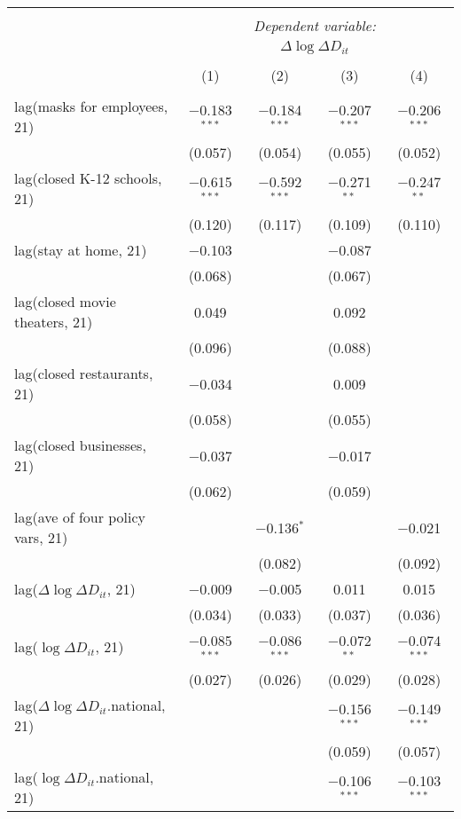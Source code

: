 \begin{tabular}{@{\extracolsep{1pt}}lcccc} 
\\[-1.8ex]\hline 
\hline \\[-1.8ex] 
 & \multicolumn{4}{c}{\textit{Dependent variable:}} \\ 
\cline{2-5} 
 & \multicolumn{4}{c}{$\Delta \log \Delta D_{it}$} \\ 
\\[-1.8ex] & (1) & (2) & (3) & (4)\\ 
\hline \\[-1.8ex] 
 lag(masks for employees, 21) & $-$0.183$^{***}$ & $-$0.184$^{***}$ & $-$0.207$^{***}$ & $-$0.206$^{***}$ \\ 
  & (0.057) & (0.054) & (0.055) & (0.052) \\ 
  lag(closed K-12 schools, 21) & $-$0.615$^{***}$ & $-$0.592$^{***}$ & $-$0.271$^{**}$ & $-$0.247$^{**}$ \\ 
  & (0.120) & (0.117) & (0.109) & (0.110) \\ 
  lag(stay at home, 21) & $-$0.103 &  & $-$0.087 &  \\ 
  & (0.068) &  & (0.067) &  \\ 
  lag(closed movie theaters, 21) & 0.049 &  & 0.092 &  \\ 
  & (0.096) &  & (0.088) &  \\ 
  lag(closed restaurants, 21) & $-$0.034 &  & 0.009 &  \\ 
  & (0.058) &  & (0.055) &  \\ 
  lag(closed businesses, 21) & $-$0.037 &  & $-$0.017 &  \\ 
  & (0.062) &  & (0.059) &  \\ 
  lag(ave of four policy vars, 21) &  & $-$0.136$^{*}$ &  & $-$0.021 \\ 
  &  & (0.082) &  & (0.092) \\ 
  lag($\Delta \log \Delta D_{it}$, 21) & $-$0.009 & $-$0.005 & 0.011 & 0.015 \\ 
  & (0.034) & (0.033) & (0.037) & (0.036) \\ 
  lag($\log \Delta D_{it}$, 21) & $-$0.085$^{***}$ & $-$0.086$^{***}$ & $-$0.072$^{**}$ & $-$0.074$^{***}$ \\ 
  & (0.027) & (0.026) & (0.029) & (0.028) \\ 
  lag($\Delta \log \Delta D_{it}$.national, 21) &  &  & $-$0.156$^{***}$ & $-$0.149$^{***}$ \\ 
  &  &  & (0.059) & (0.057) \\ 
  lag($\log \Delta D_{it}$.national, 21) &  &  & $-$0.106$^{***}$ & $-$0.103$^{***}$ \\ 

\end{tabular}
